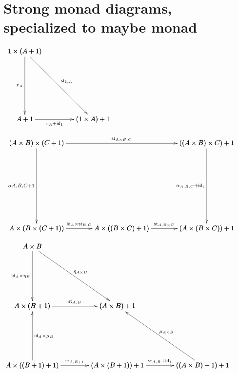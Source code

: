 \documentclass{article}[12pt]
\begin{document}
\section{Strong monad diagrams, specialized to maybe monad}

  \begin{center}
    \begin{math}
      \bfig
      \scalefactor{2.0}
      \btriangle[1 \times (A+1)`A + 1`(1 \times A) + 1;r_A`\st_{1,A}`r_{A} + \id_1]
      \efig
    \end{math}
  \end{center}
  \begin{center}
    \begin{math}
      \bfig
      \scalefactor{2.5}
      \node topleft(0,500)[(A \times B) \times (C+1)]
      \node topright(1000,500)[((A \times B) \times C) + 1]
      \node botleft(0,0)[A \times (B \times (C + 1))]
      \node botmid(500,0)[A \times ((B \times C) + 1)]
      \node botright(1000,0)[(A \times (B \times C)) + 1]
      \arrow[topleft`topright;\st_{A \times B, C}]
      \arrow[topright`botright;\alpha_{A,B,C} + \id_1]
      \arrow[topleft`botleft;\alpha{A,B,C+1}]
      \arrow[botleft`botmid; \id_A \times \st_{B, C}]
      \arrow[botmid`botright;\st_{A, B \times C}]
      \efig
    \end{math}
  \end{center}
  \begin{center}
    \begin{math}
      \bfig
      \scalefactor{2.5}%
      \node AxB(0,700)[A \times B]%
      \node AxTB(0,350)[A \times (B + 1)]%
      \node AxT2B(0,0)[A \times ((B + 1) + 1)]%
      \node TAxB(500,350)[(A \times B) + 1]%
      \node TAxTB(500,0)[(A \times (B + 1)) + 1]%
      \node T2AxB(1000,0)[((A \times B) + 1) + 1]%
      \arrow[AxB`AxTB;\id_A \times \eta_B]%
      \arrow[AxT2B`AxTB;\id_A \times \mu_B]%
      \arrow[AxB`TAxB;\eta_{A \times B}]%
      \arrow[AxTB`TAxB;\st_{A,B}]%
      \arrow[AxT2B`TAxTB;\st_{A, B + 1}]%
      \arrow[TAxTB`T2AxB;\st_{A,B} + \id_1]%
      \arrow[T2AxB`TAxB;\mu_{A \times B}]%
      \efig
    \end{math}
  \end{center}
\end{document}
